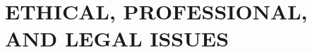 \section{ETHICAL, PROFESSIONAL, AND LEGAL ISSUES}\label{sec:ethical,-professional,-and-legal-issues}